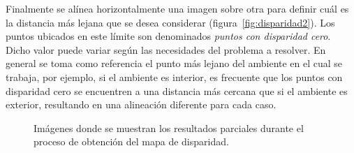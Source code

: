 \documentclass[journal]{IEEEtran}
\begin{document}
Finalmente se al\'inea horizontalmente una imagen sobre otra para definir cu\'al es la distancia m\'as lejana que se desea considerar (figura~\ref{fig:disparidad2}). Los puntos ubicados en este l\'imite son denominados \emph{puntos con disparidad cero}. Dicho valor puede variar seg\'un las necesidades del problema a resolver. En general se toma como referencia el punto m\'as lejano del ambiente en el cual se trabaja, por ejemplo, si el ambiente es interior, es frecuente que los puntos con disparidad cero se encuentren a una distancia m\'as cercana que si el ambiente es exterior, resultando en una alineaci\'on diferente para cada caso.

\begin{figure}[ht]
\centering
{}



\caption{Im\'agenes donde se muestran los resultados parciales durante el proceso de obtenci\'on del mapa de disparidad.}
\label{fig:piernas}
\end{figure}
\end{document}
